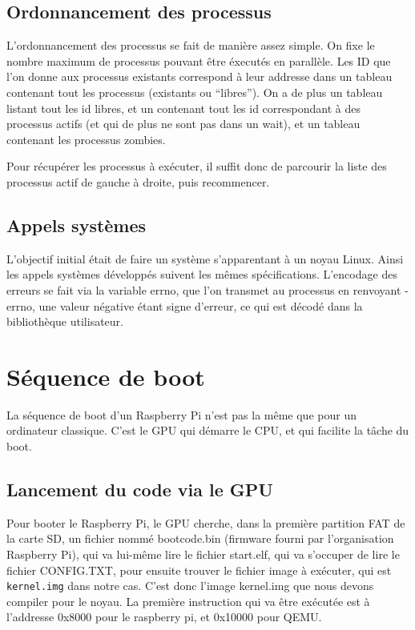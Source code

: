 \documentclass[a4paper]{article}
\begin{document}
\subsection{Ordonnancement des processus}

L'ordonnancement des processus se fait de manière assez simple. On fixe le
nombre maximum de processus pouvant être éxecutés en parallèle. Les ID que l'on
donne aux processus existants correspond à leur addresse dans un tableau
contenant tout les processus (existants ou ``libres''). On a de plus un tableau
listant tout les id libres, et un contenant tout les id correspondant à des
processus actifs (et qui de plus ne sont pas dans un wait), et un tableau
contenant les processus zombies.

Pour récupérer les processus à exécuter, il suffit donc de parcourir la liste
des processus actif de gauche à droite, puis recommencer.

\subsection{Appels systèmes}
L'objectif initial était de faire un système s'apparentant à un noyau Linux.
Ainsi les appels systèmes développés suivent les mêmes spécifications.
L'encodage des erreurs se fait via la variable errno, que l'on transmet au
processus en renvoyant -errno, une valeur négative étant signe d'erreur, ce qui
est décodé dans la bibliothèque utilisateur.

\section{Séquence de boot}

La séquence de boot d'un Raspberry Pi n'est pas la même que pour un ordinateur
classique. C'est le GPU qui démarre le CPU, et qui facilite la tâche du boot.

\subsection{Lancement du code via le GPU}

Pour booter le Raspberry Pi, le GPU cherche, dans la première partition FAT de la
carte SD, un fichier nommé bootcode.bin (firmware fourni par l'organisation Raspberry Pi),
qui va lui-même lire le fichier start.elf, qui va s'occuper de lire le fichier CONFIG.TXT, pour
ensuite trouver le fichier image à exécuter, qui est \verb!kernel.img! dans notre
cas.
C'est donc l'image kernel.img que nous devons compiler pour le noyau. La
première instruction qui va être exécutée est à l'addresse 0x8000 pour le
raspberry pi, et 0x10000 pour QEMU.
\end{document}
